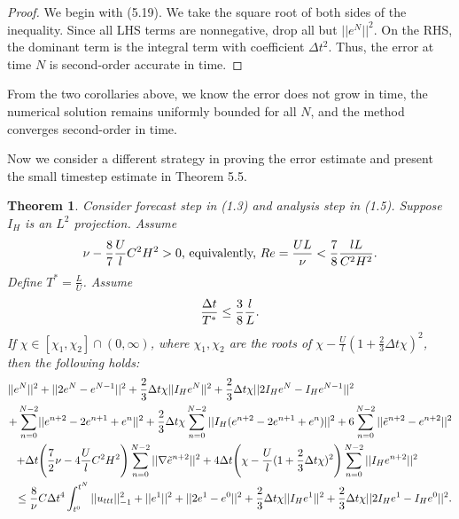 \documentclass[11pt,a4paper]{article}
\newtheorem{theorem}{Theorem}[section]
\begin{document}
\begin{proof}
    We begin with (5.19). We take the square root of both sides of the inequality. Since all LHS terms are nonnegative, drop all but $||e^N||^2$. On the RHS, the dominant term is the integral term with coefficient $\Delta t^2$. Thus, the error at time $N$ is second-order accurate in time. 
\end{proof}
From the two corollaries above, we know the error does not grow in time, the numerical solution remains uniformly bounded for all $N$, and the method converges second-order in time.

Now we consider a different strategy in proving the error estimate and present the small timestep estimate in Theorem 5.5.

\begin{theorem}
    Consider forecast step in (1.3) and analysis step in (1.5). Suppose $I_H$ is an $L^2$ projection. Assume 
    \begin{align}
        \nu-\frac{8}{7}\frac{U}{l}C^2H^2>0 \text{, equivalently, } Re=\frac{UL}{\nu}<\frac{7}{8}\frac{lL}{C^2H^2}. \notag
    \end{align}
    Define $T^*=\frac{L}{U}$. Assume
    \begin{align}
    \frac{\Delta t}{T^*} \leq \frac{3}{8}\frac{l}{L}. \notag
    \end{align}
    If $\chi\in [\chi_1,\chi_2]\cap(0,\infty)$, where $\chi_1,\chi_2$ are the roots of $\chi-\frac{U}{l}(1+\frac{2}{3}\Delta t\chi)^2$, then the following holds:
    \begin{align}
        ||e^N||^2
        &+||2e^N-e^{N-1}||^2+\frac{2}{3}\Delta t\chi ||I_He^N||^2+\frac{2}{3}\Delta t\chi ||2I_He^N-I_He^{N-1}||^2  \notag \\
        +\sum_{n=0}^{N-2}&||e^{n+2}-2e^{n+1}+e^n||^2 + \frac{2}{3}\Delta t\chi \sum_{n=0}^{N-2} ||I_H(e^{n+2}-2e^{n+1}+e^n)||^2 + 6 \sum_{n=0}^{N-2} ||\tilde{e}^{n+2}-e^{n+2}||^2 \notag \\
        +\Delta t&\Bigg(\frac{7}{2}\nu -4\frac{U}{l}C^2H^2\Bigg) \sum_{n=0}^{N-2}||\nabla \tilde{e}^{n+2}||^2+4\Delta t\Bigg(\chi - \frac{U}{l}(1+\frac{2}{3}\Delta t\chi)^2\Bigg)\sum_{n=0}^{N-2} ||I_He^{n+2}||^2 \\
        \leq \frac{8}{\nu}&C\Delta t^4\int_{t^0}^{t^{N}}||u_{ttt}||_{-1}^2 + ||e^1||^2+||2e^1-e^0||^2+\frac{2}{3}\Delta t\chi ||I_He^1||^2+\frac{2}{3}\Delta t\chi ||2I_He^1-I_He^0||^2. \notag
    \end{align}
\end{theorem}
\end{document}
